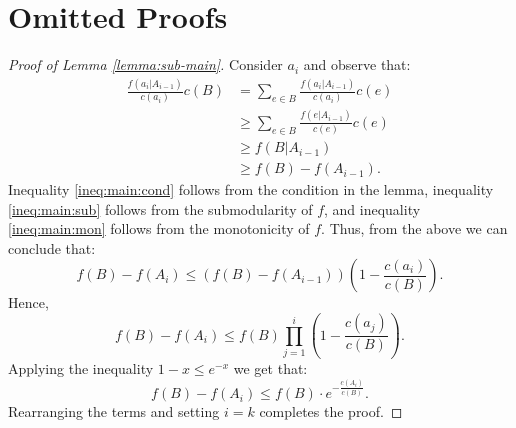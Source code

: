 \documentclass[a4paper]{article}
\begin{document}
\section{Omitted Proofs}
\label{appendix:omitted}
\begin{proof}[Proof of Lemma \ref{lemma:sub-main}]
	

		Consider $a_i$ and observe that:
		\begin{align}
		\frac{f(a_i|A_{i-1})}{c(a_i)}c(B)
		& = \sum_{e \in B} \frac{f(a_i|A_{i-1})}{c(a_i)}c(e)
		\nonumber
		\\ 	& \geq \sum_{e \in B} \frac{f(e|A_{i-1})}{c(e)}c(e)
		\label{ineq:main:cond}
		\\	& \geq f(B|A_{i-1})
		\label{ineq:main:sub}
		\\ 	& \geq f(B) - f(A_{i-1}).
		\label{ineq:main:mon}
		\end{align}
		Inequality \eqref{ineq:main:cond} follows from the condition in the lemma, inequality \eqref{ineq:main:sub} follows from the submodularity of $f$, and inequality \eqref{ineq:main:mon} follows from the monotonicity of $f$.
		Thus, from the above we can conclude that:
		$$
		f(B) - f(A_i)  \leq (f(B) - f(A_{i - 1}))
		\left(1 - \frac{c(a_i)}{c(B)}\right).
		$$
		Hence,
		$$
		f(B) - f(A_i)  \leq f(B) \prod_{j = 1}^{i}
		\left(1 - \frac{c(a_j)}{c(B)}\right).
		$$
		Applying the inequality $1 - x \leq e^{-x}$ we get that:
		$$
		f(B) - f(A_i)  \leq f(B)\cdot
		e^{-\frac{c(A_i)}{c(B)}}.
		$$
		Rearranging the terms and setting $i = k$ completes the proof.

	
	
	
\end{proof}
\end{document}
